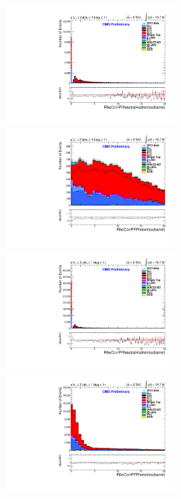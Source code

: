 \documentclass[oneside, a4paper, 11pt, ]{report}
\begin{document}
\begin{figure}
\includegraphics[width=0.5\textwidth]{Plots/ControlPlots/TTbarDiLeptonAnalysis/MuMu/Photons/AllPhotons/Photon_RhoCorrectedPFNeutralHadronIso_barrel_splitTTbar_ratio.pdf}
\includegraphics[width=0.5\textwidth]{Plots/ControlPlots/TTbarDiLeptonAnalysis/MuMu/Photons/AllPhotons/Photon_RhoCorrectedPFPhotonIso_barrel_splitTTbar_ratio.pdf}\\
\includegraphics[width=0.5\textwidth]{Plots/ControlPlots/TTbarDiLeptonAnalysis/EE/Photons/AllPhotons/Photon_RhoCorrectedPFNeutralHadronIso_barrel_splitTTbar_ratio.pdf}
\includegraphics[width=0.5\textwidth]{Plots/ControlPlots/TTbarDiLeptonAnalysis/EE/Photons/AllPhotons/Photon_RhoCorrectedPFPhotonIso_barrel_splitTTbar_ratio.pdf}\\

\end{figure}
\end{document}
